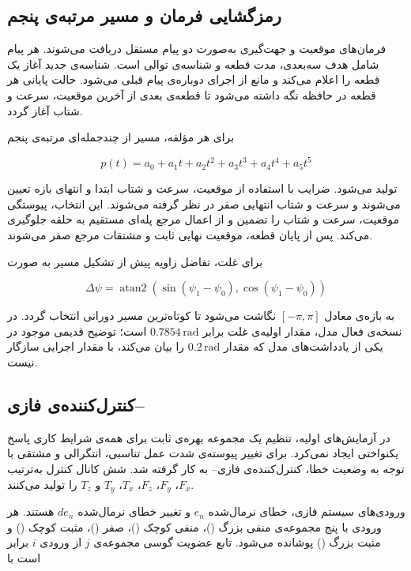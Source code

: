 \subsection{رمزگشایی فرمان و مسیر مرتبه‌ی پنجم}
\label{sec:method-trajectory}

فرمان‌های موقعیت و جهت‌گیری به‌صورت دو پیام مستقل دریافت می‌شوند. هر پیام شامل هدف سه‌بعدی، مدت قطعه و شناسه‌ی توالی است. شناسه‌ی جدید آغاز یک قطعه را اعلام می‌کند و مانع از اجرای دوباره‌ی پیام قبلی می‌شود. حالت پایانی هر قطعه در حافظه نگه داشته می‌شود تا قطعه‌ی بعدی از آخرین موقعیت، سرعت و شتاب آغاز گردد.

برای هر مؤلفه، مسیر از چندجمله‌ای مرتبه‌ی پنجم

\begin{equation}
	p(t)=a_0+a_1t+a_2t^2+a_3t^3+a_4t^4+a_5t^5
	\label{eq:method-quintic}
\end{equation}

تولید می‌شود. ضرایب با استفاده از موقعیت، سرعت و شتاب ابتدا و انتهای بازه تعیین می‌شوند و سرعت و شتاب انتهایی صفر در نظر گرفته می‌شوند. این انتخاب، پیوستگی موقعیت، سرعت و شتاب را تضمین و از اعمال مرجع پله‌ای مستقیم به حلقه جلوگیری می‌کند. پس از پایان قطعه، موقعیت نهایی ثابت و مشتقات مرجع صفر می‌شوند.

برای غلت، تفاضل زاویه پیش از تشکیل مسیر به صورت

\begin{equation}
	\Delta\psi=\operatorname{atan2}\!\left(\sin(\psi_1-\psi_0),\cos(\psi_1-\psi_0)\right)
	\label{eq:method-yaw-wrap}
\end{equation}

به بازه‌ی معادل $[-\pi,\pi]$ نگاشت می‌شود تا کوتاه‌ترین مسیر دورانی انتخاب گردد. در نسخه‌ی فعال مدل، مقدار اولیه‌ی غلت برابر $0.7854\,\mathrm{rad}$ است؛ توضیح قدیمی موجود در یکی از یادداشت‌های مدل که مقدار $0.2\,\mathrm{rad}$ را بیان می‌کند، با مقدار اجرایی سازگار نیست.

\subsection{کنترل‌کننده‌ی فازی--}

در آزمایش‌های اولیه، تنظیم یک مجموعه بهره‌ی ثابت برای همه‌ی شرایط کاری پاسخ یکنواختی ایجاد نمی‌کرد. برای تغییر پیوسته‌ی شدت عمل تناسبی، انتگرالی و مشتقی با توجه به وضعیت خطا، کنترل‌کننده‌ی فازی-- به کار گرفته شد. شش کانال کنترل به‌ترتیب $F_x$، $F_y$، $F_z$، $T_x$، $T_y$ و $T_z$ را تولید می‌کنند.

ورودی‌های سیستم فازی، خطای نرمال‌شده $e_n$ و تغییر خطای نرمال‌شده $de_n$ هستند. هر ورودی با پنج مجموعه‌ی منفی بزرگ ()، منفی کوچک ()، صفر ()، مثبت کوچک () و مثبت بزرگ () پوشانده می‌شود. تابع عضویت گوسی مجموعه‌ی $j$ از ورودی $i$ برابر است با

